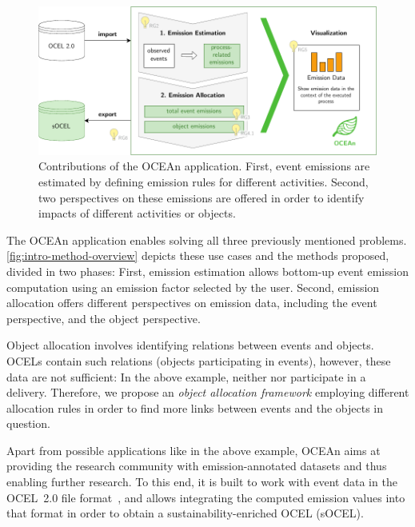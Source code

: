 \begin{figure}[t]
	\centering
	\includegraphics[width=.9\textwidth]{figures/concept/method-overview-1-intro.pdf}
	\caption{Contributions of the OCEAn application. First, event emissions are estimated by defining emission rules for different activities. Second, two perspectives on these emissions are offered in order to identify impacts of different activities or objects.}
	\label{fig:intro-method-overview}
\end{figure}

The OCEAn application enables solving all three previously mentioned problems.
\autoref{fig:intro-method-overview} depicts these use cases and the methods proposed, divided in two phases:
First, emission estimation allows bottom-up event emission computation using an emission factor selected by the user.
Second, emission allocation offers different perspectives on emission data, including the event perspective, and the object perspective.

Object allocation involves identifying relations between events and objects.
OCELs contain such relations (objects participating in events), however, these data are not sufficient:
In the above example, neither  nor  participate in a delivery.
Therefore, we propose an \textit{object allocation framework} employing different allocation rules in order to find more links between events and the objects in question.

Apart from possible applications like in the above example, OCEAn aims at providing the research community with emission-annotated datasets and thus enabling further research.
To this end, it is built to work with event data in the OCEL~2.0 file format~\cite{OCEL2},
and allows integrating the computed emission values into that format
in order to obtain a sustainability-enriched OCEL (sOCEL).

%

